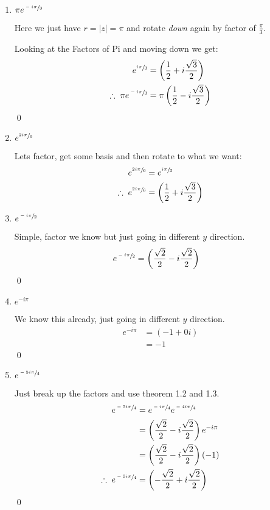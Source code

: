 \begin{enumerate}
\begin{enumerate}
		\item $\pi e^{\sfrac{-i\pi}{3}}$

		Here we just have $ r = |z| = \pi$ and rotate \textit{down} again by factor of $\frac{\pi}{3}.$

		Looking at the Factors of Pi and moving down we get:
		\begin{align*}
			e^{\sfrac{i\pi}{3}} &= \left( \frac{1}{2} + i\frac{\sqrt{3}}{2} \right) \\
			\therefore \; \pi e^{\sfrac{-i\pi}{3}} &= \pi \left( \frac{1}{2} - i\frac{\sqrt{3}}{2} \right) \\
		\end{align*}
		\qed


		\item $e^{\sfrac{2i\pi}{6}}$

		Lets factor, get some basis and then rotate to what we want:
		\begin{align*}
			e^{\sfrac{2i\pi}{6}} &= e^{\sfrac{i\pi}{3}} \\
			\therefore \; e^{\sfrac{2i\pi}{6}} &= \left( \frac{1}{2} + i\frac{\sqrt{3}}{2} \right) \\  
		\end{align*}


		\item $e^{\sfrac{-i\pi}{2}}$

		Simple, factor we know but just going in different $y$ direction.
		\begin{align*}
			e^{\sfrac{-i\pi}{2}} &= \left( \frac{\sqrt{2}}{2} - i\frac{\sqrt{2}}{2} \right)
		\end{align*}
		\qed

		\item $e^{-i\pi}$

		We know this already, just going in different $y$ direction.
		\begin{align*}
			e^{-i\pi} &= \left( -1 + 0i \right) \\
			&= -1
		\end{align*}
		\qed

		\item $e^{\sfrac{-5i\pi}{4}}$

		Just break up the factors and use theorem 1.2 and 1.3.
		\begin{align*}
			e^{\sfrac{-5i\pi}{4}} &= e^{\sfrac{-i\pi}{4}} e^{\sfrac{-4i\pi}{4}} \\
			&= \left( \frac{\sqrt{2}}{2} - i\frac{\sqrt{2}}{2} \right) e^{-i\pi} \\
			&= \left( \frac{\sqrt{2}}{2} - i\frac{\sqrt{2}}{2} \right) (-1) \\
			\therefore \; e^{\sfrac{-5i\pi}{4}} &= \left( -\frac{\sqrt{2}}{2} + i\frac{\sqrt{2}}{2} \right) \\
		\end{align*}
		\qed 
	\end{enumerate}


\end{enumerate}
